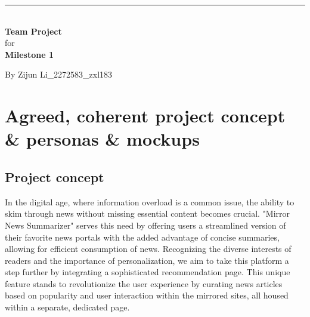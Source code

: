 \documentclass[a4paper]{article}
\begin{document}

\begin{titlepage}
	
	\rule{\linewidth}{5pt}
	\raggedleft
	\fontsize{38pt}{50pt}\selectfont
    \textbf{\\Team Project\\}
    \fontsize{28pt}{60pt}\selectfont 
    for\\
    \fontsize{38pt}{60pt}\selectfont 
    \textbf{Milestone 1\\}
	
	\vfill %
	
	
	\parbox[t]{0.93\textwidth}{ %
		\raggedleft %
		\large %
		{\Large By Zijun Li\_2272583\_zxl183}\\[4pt] %
	}
	
\end{titlepage}

\begin{center}
	\tableofcontents
\end{center}
\newpage

\section{Agreed, coherent project concept \& personas \& mockups}

\subsection{Project concept}

In the digital age, where information overload is a common issue, the ability to skim through news without missing essential content becomes crucial. "Mirror News Summarizer" serves this need by offering users a streamlined version of their favorite news portals with the added advantage of concise summaries, allowing for efficient consumption of news. Recognizing the diverse interests of readers and the importance of personalization, we aim to take this platform a step further by integrating a sophisticated recommendation page. This unique feature stands to revolutionize the user experience by curating news articles based on popularity and user interaction within the mirrored sites, all housed within a separate, dedicated page.
\end{document}
